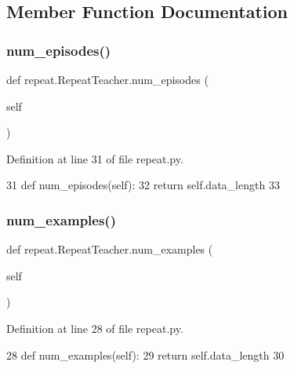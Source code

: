 \subsection{Member Function Documentation}
\mbox{\label{classrepeat_1_1RepeatTeacher_a9cafb9941e59acc751300cc481cbdf24}} 
\subsubsection{\texorpdfstring{num\+\_\+episodes()}{num\_episodes()}}
{\footnotesize\ttfamily def repeat.\+Repeat\+Teacher.\+num\+\_\+episodes (\begin{DoxyParamCaption}\item[{}]{self }\end{DoxyParamCaption})}



Definition at line 31 of file repeat.\+py.


\begin{DoxyCode}
31     \textcolor{keyword}{def }num\_episodes(self):
32         \textcolor{keywordflow}{return} self.data\_length
33 \end{DoxyCode}
\mbox{\label{classrepeat_1_1RepeatTeacher_a81ce5597db3285a2580204cc11643a46}} 
\subsubsection{\texorpdfstring{num\+\_\+examples()}{num\_examples()}}
{\footnotesize\ttfamily def repeat.\+Repeat\+Teacher.\+num\+\_\+examples (\begin{DoxyParamCaption}\item[{}]{self }\end{DoxyParamCaption})}



Definition at line 28 of file repeat.\+py.


\begin{DoxyCode}
28     \textcolor{keyword}{def }num\_examples(self):
29         \textcolor{keywordflow}{return} self.data\_length
30 
\end{DoxyCode}
\mbox{\label{classrepeat_1_1RepeatTeacher_a8e4298b0c8ff674b8b4c3c2f73d0e71d}} 
